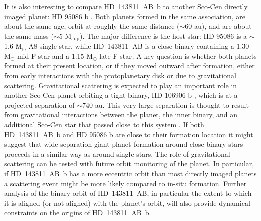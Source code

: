 \documentclass[]{aastex701} %
\begin{document}
It is also interesting to compare HD~143811~AB~b to another Sco-Cen directly imaged planet: HD 95086 b \citep{rameau:2013}. Both planets formed in the same association, are about the same age, orbit at roughly the same distance ($\sim$60 au), and are about the same mass ($\sim$5 M$_{\textrm{Jup}}$). The major difference is the host star: HD 95086 is a $\sim$1.6 M$_\odot$ A8 single star, while HD~143811~AB is a close binary containing a 1.30 M$_\odot$ mid-F star and a 1.15 M$_\odot$ late-F star. A key question is whether both planets formed at their present location, or if they moved outward after formation, either from early interactions with the protoplanetary disk or due to gravitational scattering. Gravitational scattering is expected to play an important role in another Sco-Cen planet orbiting a tight binary, HD 106906 b \citep{bailey:2014}, which is at a projected separation of $\sim$740 au. This very large separation is thought to result from gravitational interactions between the planet, the inner binary, and an additional Sco-Cen star that passed close to this system \citep{derosa:2019,nguyen:2021}. If both HD~143811~AB~b and HD 95086 b are close to their formation location it might suggest that wide-separation giant planet formation around close binary stars proceeds in a similar way as around single stars. The role of gravitational scattering can be tested with future orbit monitoring of the planet. In particular, if HD~143811~AB~b has a more eccentric orbit than most directly imaged planets \citep{bowler:2020} a scattering event might be more likely compared to in-situ formation. Further analysis of the binary orbit of HD~143811~AB, in particular the extent to which it is aligned (or not aligned) with the planet's orbit, will also provide dynamical constraints on the origins of HD~143811~AB~b.
\end{document}
